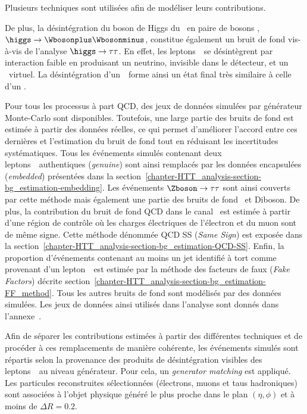 Plusieurs techniques sont utilisées afin de modéliser leurs contributions.
\par
De plus, la désintégration du boson de Higgs du \SM\ en paire de bosons \Wboson, $\higgs\to\Wbosonplus\Wbosonminus$, constitue également un bruit de fond vis-à-vis de l'analyse $\higgs\to\tau\tau$.
En effet, les leptons~\tau\ se désintègrent par interaction faible en produisant un neutrino, invisible dans le détecteur, et un \Wboson\ virtuel.
La désintégration d'un~\tau\ forme ainsi un état final très similaire à celle d'un \Wboson.
\par
Pour tous les processus à part QCD, des jeux de données simulées par générateur Monte-Carlo sont disponibles.
Toutefois, une large partie des bruits de fond est estimée à partir des données réelles,
ce qui permet d'améliorer l'accord entre ces dernières et l'estimation du bruit de fond tout en réduisant les incertitudes systématiques.
Tous les événements simulés contenant deux leptons~\tau\ authentiques (\emph{genuine}) sont ainsi remplacés par les données encapsulées (\emph{embedded}) présentées dans la section~\ref{chapter-HTT_analysis-section-bg_estimation-embedding}.
Les événements $\Zboson\to\tau\tau$ sont ainsi couverts par cette méthode mais également une partie des bruits de fond \ttbar\ et Diboson.
De plus, la contribution du bruit de fond QCD dans le canal \ele\mu\ est estimée à partir d'une région de contrôle où les charges électriques de l'électron et du muon sont de même signe.
Cette méthode dénommée \og QCD SS \fg{} (\emph{Same Sign}) est exposée dans la section~\ref{chapter-HTT_analysis-section-bg_estimation-QCD-SS}.
Enfin, la proportion d'événements contenant au moins un jet identifié à tort comme provenant d'un lepton~\tau\ est estimée par la méthode des facteurs de faux (\emph{Fake Factors}) décrite section~\ref{chapter-HTT_analysis-section-bg_estimation-FF_method}.
Tous les autres bruits de fond sont modélisés par des données simulées.
Les jeux de données ainsi utilisés dans l'analyse sont donnés dans l'annexe~.
\par
Afin de séparer les contributions estimées à partir des différentes techniques et de procéder à ces remplacements de manière cohérente, les événements simulés sont répartis selon la provenance des produits de désintégration visibles des leptons~\tau\ au niveau générateur.
Pour cela, un \emph{generator matching} est appliqué.
Les particules reconstruites sélectionnées (électrons, muons et taus hadroniques) sont associées à l'objet physique généré le plus proche dans le plan $(\eta, \phi)$ et à moins de $\Delta R = \num{0.2}$.
